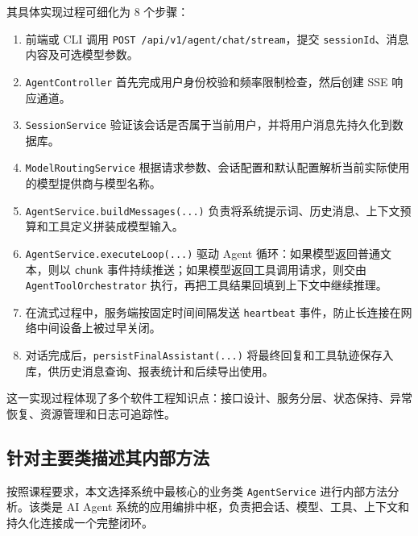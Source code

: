 \documentclass[12pt,a4paper,UTF8]{ctexart}
\begin{document}
其具体实现过程可细化为 8 个步骤：
\begin{enumerate}
    \item 前端或 CLI 调用 \texttt{POST /api/v1/agent/chat/stream}，提交 \texttt{sessionId}、消息内容及可选模型参数。
    \item \texttt{AgentController} 首先完成用户身份校验和频率限制检查，然后创建 SSE 响应通道。
    \item \texttt{SessionService} 验证该会话是否属于当前用户，并将用户消息先持久化到数据库。
    \item \texttt{ModelRoutingService} 根据请求参数、会话配置和默认配置解析当前实际使用的模型提供商与模型名称。
    \item \texttt{AgentService.buildMessages(...)} 负责将系统提示词、历史消息、上下文预算和工具定义拼装成模型输入。
    \item \texttt{AgentService.executeLoop(...)} 驱动 Agent 循环：如果模型返回普通文本，则以 \texttt{chunk} 事件持续推送；如果模型返回工具调用请求，则交由 \texttt{AgentToolOrchestrator} 执行，再把工具结果回填到上下文中继续推理。
    \item 在流式过程中，服务端按固定时间间隔发送 \texttt{heartbeat} 事件，防止长连接在网络中间设备上被过早关闭。
    \item 对话完成后，\texttt{persistFinalAssistant(...)} 将最终回复和工具轨迹保存入库，供历史消息查询、报表统计和后续导出使用。
\end{enumerate}

这一实现过程体现了多个软件工程知识点：接口设计、服务分层、状态保持、异常恢复、资源管理和日志可追踪性。

\subsection{针对主要类描述其内部方法}
按照课程要求，本文选择系统中最核心的业务类 \texttt{AgentService} 进行内部方法分析。该类是 AI Agent 系统的应用编排中枢，负责把会话、模型、工具、上下文和持久化连接成一个完整闭环。
\end{document}
